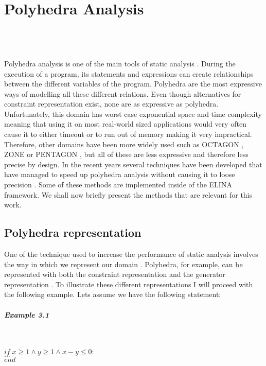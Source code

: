 
\chapter{Polyhedra Analysis}
\mbox{}\\
\mbox{}\\
\mbox{}\\
Polyhedra analysis is one of the main tools of static analysis \cite{cousot1977abstract}. During the execution of a program, its statements and expressions can create relationships between the different variables of the program. Polyhedra are the most expressive ways of modelling all these different relations. Even though alternatives for constraint representation exist, none are as expressive as polyhedra. Unfortunately, this domain has worst case exponential space and time complexity meaning that using it on most real-world sized applications would very often cause it to either timeout or to run out of memory making it very impractical. Therefore, other domains have been more widely used such as OCTAGON \cite{mine2006octagon}, ZONE \cite{mine2001new} or PENTAGON \cite{logozzo2010pentagons} , but all of these are less expressive and therefore less precise by design. In the recent years several techniques have been developed that have managed to speed up polyhedra analysis without causing it to loose precision \cite{gange2016exploiting,jourdan2017sparsity,marechal2017efficient}. Some of these methods are implemented inside of the ELINA framework. We shall now briefly present the methods that are relevant for this work.

\section{Polyhedra representation}
One of the technique used to increase the performance of static analysis involves the way in which we represent our domain \cite{singh2015making}. Polyhedra, for example, can be represented with both the constraint representation and the generator representation \cite{motzkin1953double} . To illustrate these different representations I will proceed with the following example. Lets assume we have the following statement:
\paragraph{Example 3.1}\mbox{}\\
\begin{center}
	$if \; x\geq1\wedge y \geq 1 \wedge x - y \leq 0: $\\ 
	$...\;\;\;\;\;$\\
	$end \qquad\qquad\qquad\qquad$
\end{center}

